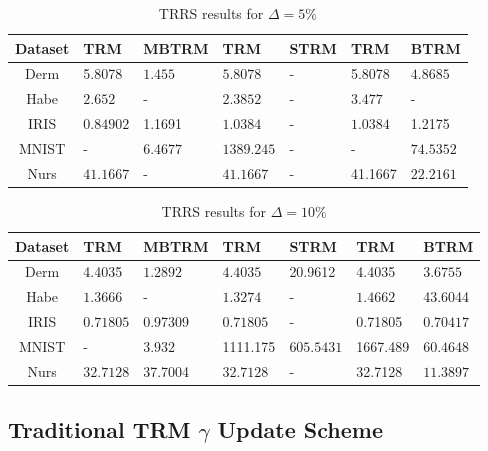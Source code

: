 \documentclass[letterpaper,12pt,titlepage,oneside,final]{book}
\begin{document}
	\begin{table}[h] 
		\centering 
		\begin{tabular}{ |c||l|l||l|l||l|l| } 
			\hline 
			\textbf{Dataset} & \textbf{TRM} & \textbf{MBTRM} & \textbf{TRM} & \textbf{STRM} & \textbf{TRM} & \textbf{BTRM} \\ 
			\hline 
			\hline 
			Derm &5.8078 & $\mathbf{1.455}$ & $\mathbf{5.8078}$ & - &5.8078 & $\mathbf{4.8685}$\\ 
			\hline 
			Habe & $\mathbf{2.652}$ & - & $\mathbf{2.3852}$ & - & $\mathbf{3.477}$ & -\\ 
			\hline 
			IRIS & $\mathbf{0.84902}$ &1.1691 & $\mathbf{1.0384}$ & - & $\mathbf{1.0384}$ &1.2175\\ 
			\hline 
			MNIST & - & $\mathbf{6.4677}$ & $\mathbf{1389.245}$ & - & - & $\mathbf{74.5352}$\\ 
			\hline 
			Nurs & $\mathbf{41.1667}$ & - & $\mathbf{41.1667}$ & - &41.1667 & $\mathbf{22.2161}$\\ 
			\hline 
		\end{tabular} 
		\caption{TRRS results for $\Delta = 5\%$} \label{SMBTRMTRM5} \end{table}
	
	\begin{table}[h] 
		\centering 
		\begin{tabular}{ |c||l|l||l|l||l|l| } 
			\hline 
			\textbf{Dataset} & \textbf{TRM} & \textbf{MBTRM} & \textbf{TRM} & \textbf{STRM} & \textbf{TRM} & \textbf{BTRM} \\ 
			\hline 
			\hline 
			Derm &4.4035 & $\mathbf{1.2892}$ & $\mathbf{4.4035}$ &20.9612 &4.4035 & $\mathbf{3.6755}$\\ 
			\hline 
			Habe & $\mathbf{1.3666}$ & - & $\mathbf{1.3274}$ & - & $\mathbf{1.4662}$ &43.6044\\ 
			\hline 
			IRIS & $\mathbf{0.71805}$ &0.97309 & $\mathbf{0.71805}$ & - &0.71805 & $\mathbf{0.70417}$\\ 
			\hline 
			MNIST & - & $\mathbf{3.932}$ &1111.175 & $\mathbf{605.5431}$ &1667.489 & $\mathbf{60.4648}$\\ 
			\hline 
			Nurs & $\mathbf{32.7128}$ &37.7004 & $\mathbf{32.7128}$ & - &32.7128 & $\mathbf{11.3897}$\\ 
			\hline 
		\end{tabular} 
		\caption{TRRS results for $\Delta = 10\%$} \label{SMBTRMTRM10} \end{table}
	
	\subsection{Traditional TRM $\gamma$ Update Scheme}
	
\end{document}
